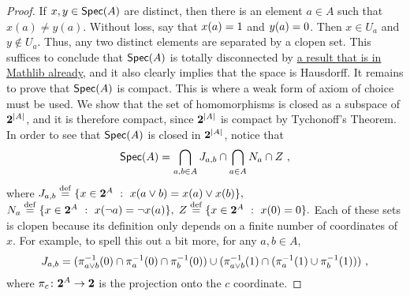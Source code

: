 \documentclass[a4paper]{article}
\begin{document}
\begin{proof}
    If $x, y \in \operatorname*{\mathsf{Spec}}(A)$ are distinct, then there is an element $a \in A$
    such that $x(a) \neq y(a)$. Without loss, say that $x(a) = 1$ and $y(a)
    = 0$. Then $x \in U_a$ and $y \not\in U_a$. Thus, any two distinct
    elements are separated by a clopen set. This suffices to conclude that
    $\operatorname*{\mathsf{Spec}}(A)$ is totally disconnected by
    \href{https://leanprover-community.github.io/mathlib4_docs/Mathlib/Topology/Connected/TotallyDisconnected.html#isTotallyDisconnected_of_isClopen_set}{
    a result that is in Mathlib already}, and it also clearly implies that the
    space is Hausdorff. It remains to prove that $\operatorname*{\mathsf{Spec}}(A)$ is compact. This is
    where a weak form of axiom of choice must be used. 
    We show that the set of homomorphisms
    is closed as a subspace of $\mathbf{2}^{|A|}$, and it is therefore compact,
    since $\mathbf{2}^{|A|}$ is compact by Tychonoff's Theorem. In order to see
    that $\operatorname*{\mathsf{Spec}}(A)$ is closed in $\mathbf{2}^{|A|}$, notice that
    \[ \operatorname*{\mathsf{Spec}}(A) = \bigcap_{a,b\in A} J_{a,b} \cap \bigcap_{a \in A} N_a \cap Z
    \ , \]
    where $J_{a,b} \stackrel{\mathrm{def}}{=} \{ x \in \mathbf{2}^A \ : \ x(a \vee b) = x(a) \vee x(b) \},$
    $N_a \stackrel{\mathrm{def}}{=}  \{x \in \mathbf{2}^A \ : \ x(\neg a) = \neg x(a) \},$ $Z \stackrel{\mathrm{def}}{=} \{ x
    \in \mathbf{2}^A \ : \ x(0) = 0\}.$ Each of these sets is clopen because its
    definition only depends on a finite number of coordinates of $x$. For example, to
    spell this out a bit more,
    for any $a, b \in A$,
    \[ J_{a,b} = 
        (\pi_{a \vee b}^{-1}(0) \cap \pi_{a}^{-1}(0) \cap
        \pi_{b}^{-1}(0)) \cup (\pi_{a \vee b}^{-1}(1) \cap
    (\pi_a^{-1}(1) \cup \pi_b^{-1}(1))) \ , \]
    where $\pi_c \colon \mathbf{2}^A \to \mathbf{2}$ is the projection onto the $c$
    coordinate.\qedhere

\end{proof}
\end{document}
